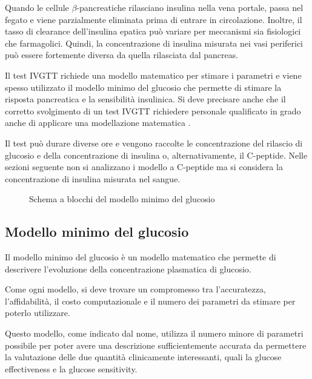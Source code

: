 Quando le cellule $\beta$-pancreatiche rilasciano insulina nella vena portale, passa nel fegato e viene parzialmente eliminata prima di entrare in circolazione. Inoltre, il tasso di clearance dell'insulina epatica può variare per meccanismi sia fisiologici che farmagolici. Quindi, la concentrazione di insulina misurata nei vasi periferici può essere fortemente diversa da quella rilasciata dal pancreas.

Il test IVGTT richiede una modello matematico per stimare i parametri e viene spesso utilizzato il modello minimo del glucosio che permette di stimare la risposta pancreatica e la sensibilità insulinica. Si deve precisare anche che il corretto svolgimento di un test IVGTT richiedere personale qualificato in grado anche di applicare una modellazione matematica \cite{cersosimo_assessment_nodate}. 

Il test può durare diverse ore e vengono raccolte le concentrazione del rilascio di glucosio e della concentrazione di insulina o, alternativamente, il C-peptide. Nelle sezioni seguente non si analizzano i modello a C-peptide ma si considera la concentrazione di insulina misurata nel sangue.





\begin{figure}[t!]
	\centering
		\scriptsize{\def\svgwidth{0.95\linewidth}
		}
	\caption{Schema a blocchi del modello minimo del glucosio}
	\label{fig:modellominimo}
\end{figure}


\subsection{Modello minimo del glucosio}



Il modello minimo del glucosio è un modello matematico che permette di descrivere l'evoluzione della concentrazione plasmatica di glucosio. 

Come ogni modello, si deve trovare un compromesso tra l'accuratezza, l'affidabilità, il costo computazionale e il numero dei parametri da stimare per poterlo utilizzare. 

Questo modello, come indicato dal nome, utilizza il numero minore di parametri possibile per poter avere una descrizione sufficientemente accurata da permettere la valutazione delle due quantità clinicamente interessanti, quali la glucose effectiveness e la glucose sensitivity. 

